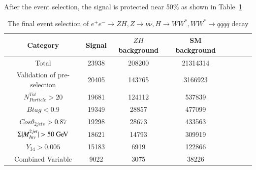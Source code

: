 \documentclass[11pt,a4paper]{cepcnote}
\begin{document}
After the event selection, the signal is protected near 50\% as shown in Table~\ref{tab:nnHfourqcutchain}
\begin{table}[H]
  \begin{center}
    \begin{tabular}{cccccccc}
      \hline \hline
      \multicolumn{1}{c}{Category}      & \multicolumn{1}{c}{Signal}&\multicolumn{1}{c}{$ZH$ background}&\multicolumn{1}{c}{SM background}\\ 
      \hline
      Total 	      	 					&   23938& 208200&	21314314	\\
	  Validation of pre-selection		  	&   20405& 143765&	3166923	\\
	  $N_{Particle}^{Tot} > 20$				&	19681& 124112& 	537839	\\
	  $Btag < 0.9$							&	19349& 28857 & 	477099	\\
	  $Cos\theta_{2jets} > 0.87  $			&	19298& 28673 &	433563	\\
	  $\Sigma|M_{Inv}^{2jet}| > 50\gev$		&   18621& 14793 &	309919	\\
	  $Y_{34} > 0.005$						&	15183& 6919  &  122866	\\
	  Combined Variable						&	9022 & 3075  &	38226	\\
      \hline \hline
    \end{tabular}
  \caption[Monte Carlo purities in the single lepton sample]{%
  The final event selection of $e^+e^-\rightarrow ZH, Z\rightarrow \nu\bar{\nu}, H\rightarrow WW^*, WW^*\rightarrow q\bar{q}q\bar{q}$ decay}
  \label{tab:nnHfourqcutchain}
  \end{center}
\end{table}
\end{document}
